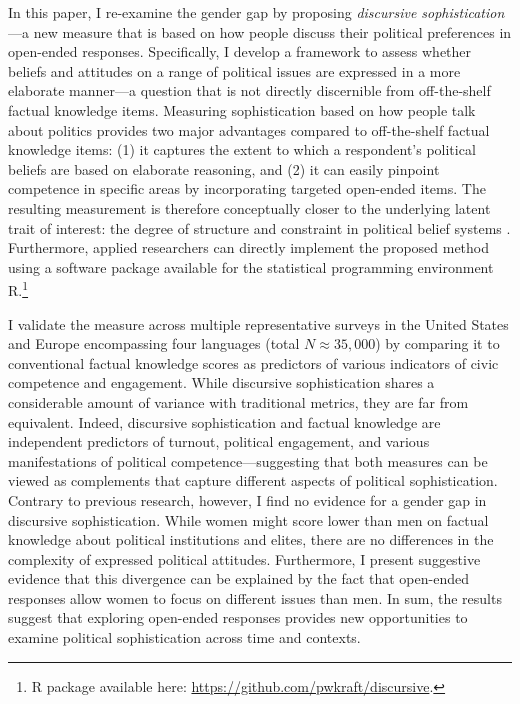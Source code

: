 In this paper, I re-examine the gender gap by proposing \textit{discursive sophistication}---a new measure that is based on how people discuss their political preferences in open-ended responses. Specifically, I develop a framework to assess whether beliefs and attitudes on a range of political issues are expressed in a more elaborate manner---a question that is not directly discernible from off-the-shelf factual knowledge items. %
Measuring sophistication based on how people talk about politics provides two major advantages compared to off-the-shelf factual knowledge items: (1) it captures the extent to which a respondent's political beliefs are based on elaborate reasoning, and (2) it can easily pinpoint competence in specific areas by incorporating targeted open-ended items. The resulting measurement is therefore conceptually closer to the underlying latent trait of interest: the degree of structure and constraint in political belief systems \citep{tetlock1983cognitive,luskin1987measuring}. Furthermore, applied researchers can directly implement the proposed method using a software package available for the statistical programming environment R.\footnote{R package available here: \url{https://github.com/pwkraft/discursive}.}

I validate the measure across multiple representative surveys in the United States and Europe encompassing four languages (total $N \approx 35,000$) by comparing it to conventional factual knowledge scores as predictors of various indicators of civic competence and engagement. While discursive sophistication shares a considerable amount of variance with traditional metrics, they are far from equivalent. Indeed, discursive sophistication and factual knowledge are independent predictors of turnout, political engagement, and various manifestations of political competence---suggesting that both measures can be viewed as complements that capture different aspects of political sophistication. Contrary to previous research, however, I find no evidence for a gender gap in discursive sophistication. While women might score lower than men on factual knowledge about political institutions and elites, there are no differences in the complexity of expressed political attitudes. Furthermore, I present suggestive evidence that this divergence can be explained by the fact that open-ended responses allow women to focus on different issues than men. In sum, the results suggest that exploring open-ended responses provides new opportunities to examine political sophistication across time and contexts.


